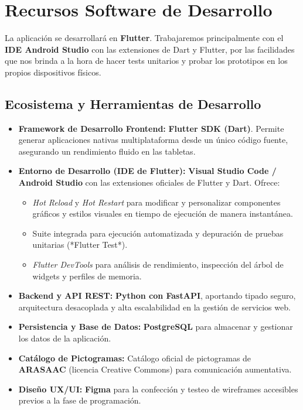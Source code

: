 \newpage
\section{Recursos Software de Desarrollo}

La aplicación se desarrollará en \textbf{Flutter}. Trabajaremos principalmente con el \textbf{IDE Android Studio} con las extensiones de Dart y Flutter, por las facilidades que nos brinda a la hora de hacer tests unitarios y probar los prototipos en los propios dispositivos físicos.

\subsection{Ecosistema y Herramientas de Desarrollo}
\begin{itemize}[leftmargin=*]
  \item \textbf{Framework de Desarrollo Frontend:} \textbf{Flutter SDK (Dart)}. Permite generar aplicaciones nativas multiplataforma desde un único código fuente, asegurando un rendimiento fluido en las tabletas.
  
  \item \textbf{Entorno de Desarrollo (IDE de Flutter):} \textbf{Visual Studio Code / Android Studio} con las extensiones oficiales de Flutter y Dart. Ofrece:
    
    \begin{itemize}
      \item \textit{Hot Reload} y \textit{Hot Restart} para modificar y personalizar componentes gráficos y estilos visuales en tiempo de ejecución de manera instantánea.
      
      \item Suite integrada para ejecución automatizada y depuración de pruebas unitarias (*Flutter Test*).
      
      \item \textit{Flutter DevTools} para análisis de rendimiento, inspección del árbol de widgets y perfiles de memoria.
    \end{itemize}
  
  \item \textbf{Backend y API REST:} \textbf{Python con FastAPI}, aportando tipado seguro, arquitectura desacoplada y alta escalabilidad en la gestión de servicios web.
  
  \item \textbf{Persistencia y Base de Datos:} \textbf{PostgreSQL} para almacenar y gestionar los datos de la aplicación.

  
  \item \textbf{Catálogo de Pictogramas:} Catálogo oficial de pictogramas de \textbf{ARASAAC} (licencia Creative Commons) para comunicación aumentativa.
  
  \item \textbf{Diseño UX/UI:} \textbf{Figma} para la confección y testeo de wireframes accesibles previos a la fase de programación.
\end{itemize}

